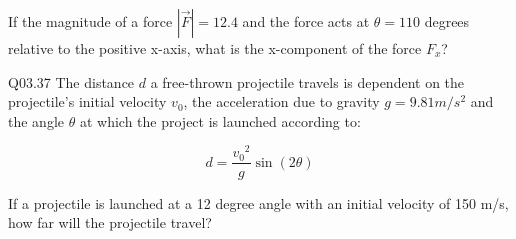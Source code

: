 \documentclass{book}
\newenvironment{problems}{}{}  %
\begin{document}
\begin{problems}
If the magnitude of a force \(|\vec{F}| = 12.4\) and the force acts at
\(\theta=110\) degrees relative to the positive x-axis, what is the
x-component of the force \(F_x\)?

Q03.37 The distance \(d\) a free-thrown projectile travels is dependent
on the projectile's initial velocity \(v_0\), the acceleration due to
gravity \(g=9.81 m/s^2\) and the angle \(\theta\) at which the project
is launched according to:

\[ d = \frac{{v_0}^2}{g} \sin(2\theta) \]

If a projectile is launched at a 12 degree angle with an initial
velocity of 150 m/s, how far will the projectile travel?
        \end{problems}

    
\end{document}
